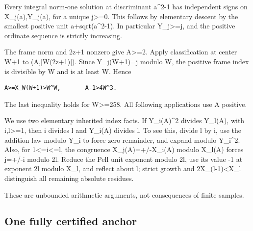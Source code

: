 Every integral norm-one solution at discriminant a\textasciicircum{}\allowbreak{}2-1 has independent signs on X\_\allowbreak{}j(a),Y\_\allowbreak{}j(a), for a unique j\textgreater{}\allowbreak{}=\allowbreak{}0. This follows by elementary descent by the smallest positive unit a+\allowbreak{}sqrt(a\textasciicircum{}\allowbreak{}2-1). In particular Y\_\allowbreak{}j\textgreater{}\allowbreak{}=\allowbreak{}j, and the positive ordinate sequence is strictly increasing.



The frame norm and 2z+\allowbreak{}1 nonzero give A\textgreater{}\allowbreak{}=\allowbreak{}2. Apply classification at center W+\allowbreak{}1 to (A,|W(2z+\allowbreak{}1)|). Since Y\_\allowbreak{}j(W+\allowbreak{}1)=\allowbreak{}j modulo W, the positive frame index is divisible by W and is at least W. Hence



\begin{verbatim}
A>=X_W(W+1)>W^W,       A-1>4W^3.
\end{verbatim}

The last inequality holds for W\textgreater{}\allowbreak{}=\allowbreak{}258. All following applications use A positive.



We use two elementary inherited index facts. If Y\_\allowbreak{}i(A)\textasciicircum{}\allowbreak{}2 divides Y\_\allowbreak{}l(A), with i,l\textgreater{}\allowbreak{}=\allowbreak{}1, then i divides l and Y\_\allowbreak{}i(A) divides l. To see this, divide l by i, use the addition law modulo Y\_\allowbreak{}i to force zero remainder, and expand modulo Y\_\allowbreak{}i\textasciicircum{}\allowbreak{}2. Also, for 1\textless{}\allowbreak{}=\allowbreak{}i\textless{}\allowbreak{}=\allowbreak{}l, the congruence X\_\allowbreak{}j(A)=\allowbreak{}+\allowbreak{}/\allowbreak{}-X\_\allowbreak{}i(A) modulo X\_\allowbreak{}l(A) forces j=\allowbreak{}+\allowbreak{}/\allowbreak{}-i modulo 2l. Reduce the Pell unit exponent modulo 2l, use its value -1 at exponent 2l modulo X\_\allowbreak{}l, and reflect about l; strict growth and 2X\_\allowbreak{}(l-1)\textless{}\allowbreak{}X\_\allowbreak{}l distinguish all remaining absolute residues.



These are unbounded arithmetic arguments, not consequences of finite samples.



\subsection{One fully certified anchor}



